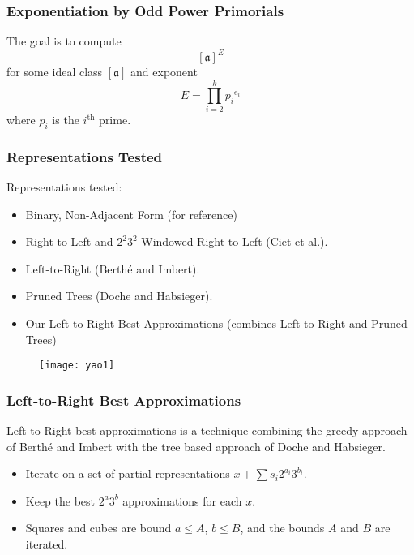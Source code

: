 \documentclass{beamer}
\newcommand{\ideal}{\mathfrak}
\newcommand{\idealclass}[1]{\left[ \ideal #1 \right]}
\newcommand{\aclass}{\idealclass a}
\newcommand{\ith}{i^{\textrm{th}}}
\begin{document}
\begin{frame}
\frametitle{Exponentiation by Odd Power Primorials}
The goal is to compute
\[
\aclass ^ E
\]
for some ideal class $\aclass$ and exponent
\[
	E = \prod_{i=2}^k {p_i}^{e_i}
\]
where $p_i$ is the $\ith$ prime.
\end{frame}


\begin{frame}
\frametitle{Representations Tested}
Representations tested:
\begin{itemize}
\item Binary, Non-Adjacent Form (for reference)
\item Right-to-Left and $2^2 3^2$ Windowed Right-to-Left (Ciet et al.).
\item Left-to-Right (Berth{\'e} and Imbert).
\item Pruned Trees (Doche and Habsieger).
\item Our Left-to-Right Best Approximations \break (combines Left-to-Right and Pruned Trees)
\end{itemize}
\end{frame}

\begin{frame}
\begin{figure}
\texttt{[image: yao1]}
\end{figure}
\end{frame}


\begin{frame}
\frametitle{Left-to-Right Best Approximations}
Left-to-Right best approximations is a technique combining the greedy approach of Berth{\'e} and Imbert with the tree based approach of Doche and Habsieger.
\begin{itemize}
\item Iterate on a set of partial representations $x + \sum s_i2^{a_i}3^{b_i}$.
\item Keep the best $2^a 3^b$ approximations for each $x$.
\item Squares and cubes are bound $a \le A$, $b \le B$, and the bounds $A$ and $B$ are iterated.
\end{itemize}
\end{frame}
\end{document}
